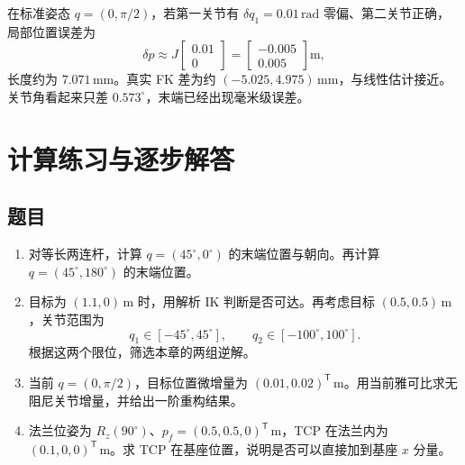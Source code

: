 \begin{examplebox}[算例 关节零偏如何变成端点误差]
在标准姿态 $q=(0,\pi/2)$，若第一关节有 $\delta q_1=0.01\,\mathrm{rad}$ 零偏、第二关节正确，局部位置误差为
\[
 \delta p\approx J\begin{bmatrix}0.01\\0\end{bmatrix}
 =\begin{bmatrix}-0.005\\0.005\end{bmatrix}\mathrm m,
\]
长度约为 $7.071\,\mathrm{mm}$。真实 FK 差为约 $(-5.025,4.975)\,\mathrm{mm}$，与线性估计接近。关节角看起来只差 $0.573^\circ$，末端已经出现毫米级误差。
\end{examplebox}

\section{计算练习与逐步解答}
\subsection*{题目}
\begin{enumerate}
\item 对等长两连杆，计算 $q=(45^\circ,0^\circ)$ 的末端位置与朝向。再计算 $q=(45^\circ,180^\circ)$ 的末端位置。
\item 目标为 $(1.1,0)\,\mathrm m$ 时，用解析 IK 判断是否可达。再考虑目标 $(0.5,0.5)\,\mathrm m$，关节范围为
\[
q_1\in[-45^\circ,45^\circ],\qquad q_2\in[-100^\circ,100^\circ].
\]
根据这两个限位，筛选本章的两组逆解。
\item 当前 $q=(0,\pi/2)$，目标位置微增量为 $(0.01,0.02)^\mathsf T\,\mathrm m$。用当前雅可比求无阻尼关节增量，并给出一阶重构结果。
\item 法兰位姿为 $R_z(90^\circ)$、$p_f=(0.5,0.5,0)^\mathsf T\,\mathrm m$，TCP 在法兰内为 $(0.1,0,0)^\mathsf T\,\mathrm m$。求 TCP 在基座位置，说明是否可以直接加到基座 $x$ 分量。
\end{enumerate}

